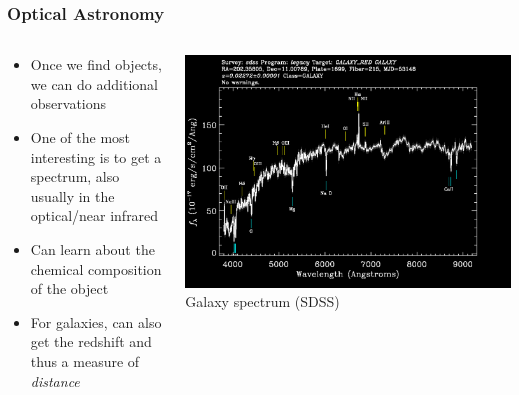 \documentclass{beamer}
\begin{document}
\frame
{

    \frametitle{Optical Astronomy}


    \begin{columns}
        \begin{column}{0.4\textwidth}
            \begin{itemize}

                \item Once we find objects, we can do additional observations

                \item One of the most interesting is to get a spectrum, also
                    usually in the optical/near infrared

                \item Can learn about the chemical composition of the object

                \item For galaxies, can also get the redshift and thus
                    a measure of {\em distance}

            \end{itemize}
        \end{column}
        \begin{column}{0.6\textwidth}
            \begin{center}
                \includegraphics[width=\textwidth]{specById-inv.png}
                \newline
                {\tiny Galaxy spectrum (SDSS)}
            \end{center}

            
        \end{column}
    \end{columns}


}
\end{document}
